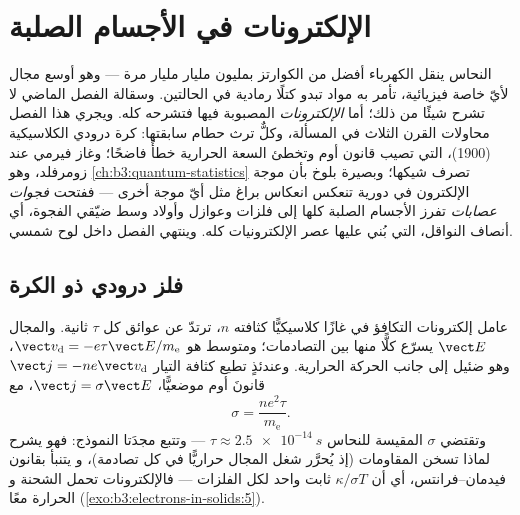 \chapter{الإلكترونات في الأجسام الصلبة}\label{ch:b3:electrons-in-solids}


النحاس ينقل الكهرباء أفضل من الكوارتز بمليون مليار مليار
مرة --- وهو أوسع مجال لأيّ خاصة فيزيائية، تأمر به
مواد تبدو كتلًا رمادية في الحالتين. وسقالة
الفصل الماضي لا تشرح شيئًا من ذلك؛ أما \emph{الإلكترونات} المصبوبة
فيها فتشرحه كله. ويجري هذا الفصل محاولات القرن الثلاث في
المسألة، وكلٌّ ترث حطام سابقتها: كرة درودي
الكلاسيكية (1900)، التي تصيب قانون أوم وتخطئ السعة الحرارية
خطأً فاضحًا؛ وغاز فيرمي عند زومرفلد، وهو
\cref{ch:b3:quantum-statistics} تصرف شيكها؛ وبصيرة بلوخ
بأن موجة الإلكترون في  دورية تنعكس انعكاس براغ
مثل أيّ موجة أخرى --- ففتحت \emph{فجوات عصابات} تفرز الأجسام الصلبة كلها
إلى فلزات وعوازل وأولاد وسط ضيّقي الفجوة،
أي أنصاف النواقل، التي بُني عليها عصر الإلكترونيات كله. وينتهي
الفصل داخل لوح شمسي.

\section{فلز درودي ذو الكرة}

\begin{proposition}\label{prop:b3:electrons-in-solids:drude}
عامل إلكترونات التكافؤ في  غازًا كلاسيكيًّا كثافته $n$،
ترتدّ عن عوائق كل $\tau$ ثانية. والمجال $\vect E$
يسرّع كلًّا منها بين التصادمات؛ ومتوسط \emph{} هو $\vect v_{\text{d}} = -e\tau\vect E/m_{\text{e}}$،
وهو ضئيل إلى جانب الحركة الحرارية. وعندئذٍ تطيع كثافة التيار $\vect j =
-ne\vect v_{\text{d}}$ قانونَ أوم موضعيًّا،
$\vect j = \sigma\vect E$، مع
\[
\sigma = \frac{ne^2\tau}{m_{\text{e}}} .
\]
وتقتضي $\sigma$ المقيسة للنحاس $\tau \approx \qty{2.5e-14}{s}$
--- وتتبع مجدَتا النموذج: فهو يشرح لماذا تسخن المقاومات
(إذ يُحرَّر شغل المجال حراريًّا في كل تصادمة)، و
يتنبأ بقانون فيدمان--فرانتس، أي أن $\kappa/\sigma T$ ثابت
واحد لكل الفلزات --- فالإلكترونات تحمل الشحنة و
الحرارة معًا (\cref{exo:b3:electrons-in-solids:5}).
\end{proposition}

